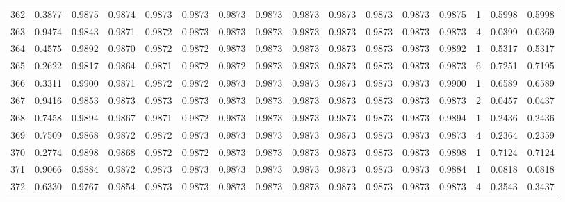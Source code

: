 \begin{tabular}{lrrrrrrrrrrrrrrr}
362 &      0.3877 &  0.9875 &  0.9874 &  0.9873 &  0.9873 &  0.9873 &  0.9873 &  0.9873 &  0.9873 &  0.9873 &   0.9873 &     0.9875 &      1 &                    0.5998 &                     0.5998 \\
363 &      0.9474 &  0.9843 &  0.9871 &  0.9872 &  0.9873 &  0.9873 &  0.9873 &  0.9873 &  0.9873 &  0.9873 &   0.9873 &     0.9873 &      4 &                    0.0399 &                     0.0369 \\
364 &      0.4575 &  0.9892 &  0.9870 &  0.9872 &  0.9872 &  0.9873 &  0.9873 &  0.9873 &  0.9873 &  0.9873 &   0.9873 &     0.9892 &      1 &                    0.5317 &                     0.5317 \\
365 &      0.2622 &  0.9817 &  0.9864 &  0.9871 &  0.9872 &  0.9872 &  0.9873 &  0.9873 &  0.9873 &  0.9873 &   0.9873 &     0.9873 &      6 &                    0.7251 &                     0.7195 \\
366 &      0.3311 &  0.9900 &  0.9871 &  0.9872 &  0.9872 &  0.9873 &  0.9873 &  0.9873 &  0.9873 &  0.9873 &   0.9873 &     0.9900 &      1 &                    0.6589 &                     0.6589 \\
367 &      0.9416 &  0.9853 &  0.9873 &  0.9873 &  0.9873 &  0.9873 &  0.9873 &  0.9873 &  0.9873 &  0.9873 &   0.9873 &     0.9873 &      2 &                    0.0457 &                     0.0437 \\
368 &      0.7458 &  0.9894 &  0.9867 &  0.9871 &  0.9872 &  0.9873 &  0.9873 &  0.9873 &  0.9873 &  0.9873 &   0.9873 &     0.9894 &      1 &                    0.2436 &                     0.2436 \\
369 &      0.7509 &  0.9868 &  0.9872 &  0.9872 &  0.9873 &  0.9873 &  0.9873 &  0.9873 &  0.9873 &  0.9873 &   0.9873 &     0.9873 &      4 &                    0.2364 &                     0.2359 \\
370 &      0.2774 &  0.9898 &  0.9868 &  0.9872 &  0.9872 &  0.9873 &  0.9873 &  0.9873 &  0.9873 &  0.9873 &   0.9873 &     0.9898 &      1 &                    0.7124 &                     0.7124 \\
371 &      0.9066 &  0.9884 &  0.9872 &  0.9873 &  0.9873 &  0.9873 &  0.9873 &  0.9873 &  0.9873 &  0.9873 &   0.9873 &     0.9884 &      1 &                    0.0818 &                     0.0818 \\
372 &      0.6330 &  0.9767 &  0.9854 &  0.9873 &  0.9873 &  0.9873 &  0.9873 &  0.9873 &  0.9873 &  0.9873 &   0.9873 &     0.9873 &      4 &                    0.3543 &                     0.3437 \\

\end{tabular}
